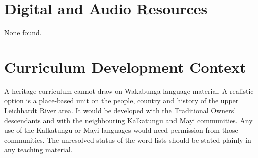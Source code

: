 \documentclass[12pt]{article}
\begin{document}
\section{Digital and Audio Resources}
None found.

\section{Curriculum Development Context}
A heritage curriculum cannot draw on Wakabunga language material. A realistic option is a place-based unit on the people, country and history of the upper Leichhardt River area. It would be developed with the Traditional Owners' descendants and with the neighbouring Kalkatungu and Mayi communities. Any use of the Kalkatungu or Mayi languages would need permission from those communities. The unresolved status of the word lists should be stated plainly in any teaching material.
\end{document}
